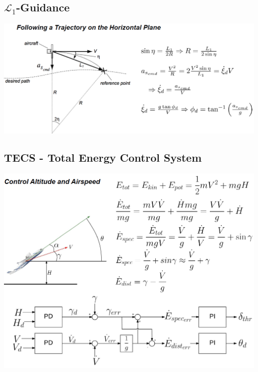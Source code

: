 \documentclass[a4paper, 8pt]{extarticle}
\begin{document}
\begin{multicols*}{3}
\subsection{$\mathcal{L}_1$-Guidance}
\begin{center}
\includegraphics[width=0.8\linewidth]{images/L1_Guidance.PNG}
\end{center}

\subsection{TECS - Total Energy Control System}
\begin{center}
\includegraphics[width=0.8\linewidth]{images/TECS.png}
\end{center}



\end{multicols*}
\end{document}

